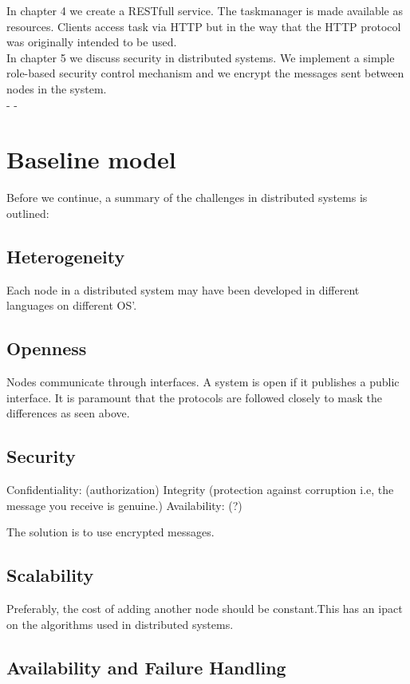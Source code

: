 In chapter 4 we create a RESTfull service. The taskmanager is made available as resources. 
Clients access task via HTTP but in the way that the HTTP protocol was originally intended to be used. \\

In chapter 5 we discuss security in distributed systems. We implement a simple role-based security control mechanism and we encrypt the messages sent between nodes in the system.    \\
-
-
\section{Baseline model}

Before we continue, a summary of the challenges in distributed systems is outlined:


\subsection{Heterogeneity}
Each node in a distributed system may have been developed in different languages on different OS’.   

\subsection{Openness}

Nodes communicate through interfaces. A system is open if it publishes a public interface. It is paramount that the protocols are followed closely to mask the differences as seen above. 

\subsection{Security}

Confidentiality: (authorization)
Integrity (protection against corruption i.e, the message you receive is genuine.)
Availability: (?)


The solution is to use encrypted messages.

\subsection{Scalability}

Preferably, the cost of adding another node should be constant.This has an ipact on the algorithms used in distributed systems.

\subsection{Availability and Failure Handling}

